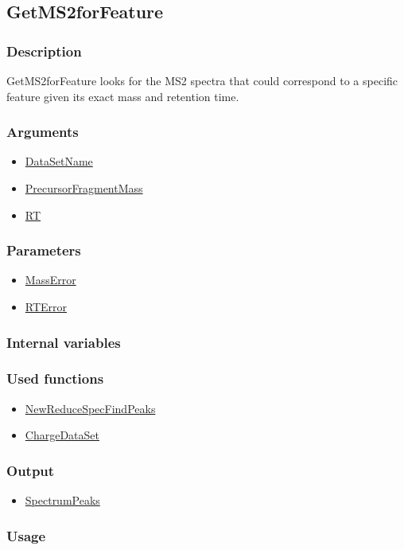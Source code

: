 \subsection{GetMS2forFeature}\label{GetMS2forFeature}
\subsubsection{Description}
GetMS2forFeature looks for the MS2 spectra that could correspond to a specific feature given its exact mass and retention time.
\subsubsection{Arguments}
\begin{itemize}
\item \hyperref[DataSetName]{DataSetName}
\item \hyperref[PrecursorFragmentMass]{PrecursorFragmentMass}
\item \hyperref[RT]{RT}
\end{itemize}
\subsubsection{Parameters}
\begin{itemize}
\item \hyperref[MassError]{MassError}
\item \hyperref[RTError]{RTError}
\end{itemize}
\subsubsection{Internal variables}
\subsubsection{Used functions}
\begin{itemize}
\item \hyperref[NewReduceSpecFindPeaks]{NewReduceSpecFindPeaks}
\item \hyperref[ChargeDataSet]{ChargeDataSet}
\end{itemize}
\subsubsection{Output}
\begin{itemize}
\item \hyperref[SpectrumPeaks]{SpectrumPeaks} %
\end{itemize}
\subsubsection{Usage}


